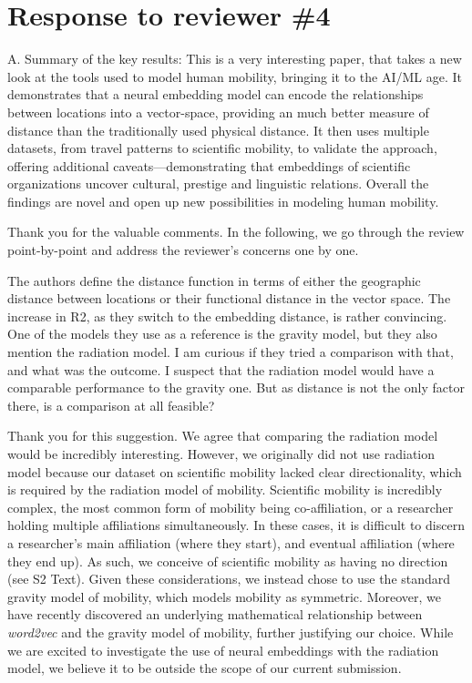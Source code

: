 \documentclass[12pt,a4paper]{article}
\newcommand{\response}[1]{{\leavevmode\noindent #1}}
\newcommand{\rcomment}[1]{%
\vspace{10pt}
\begin{tcolorbox}[colback=black!3,colframe=white!45!black]
#1
\end{tcolorbox}
}
\begin{document}
\section*{Response to reviewer \#4}

\rcomment{%
A. Summary of the key results:
This is a very interesting paper, that takes a new look at the tools used to model human mobility, bringing it to the AI/ML age. It demonstrates that a neural embedding model can encode the relationships between locations into a vector-space, providing an much better measure of distance than the traditionally used physical distance. It then uses multiple datasets, from travel patterns to scientific mobility, to validate the approach, offering additional caveats—demonstrating that embeddings of scientific organizations uncover cultural, prestige and linguistic relations. Overall the findings are novel and open up new possibilities in modeling human mobility.
}

\response{%
Thank you for the valuable comments. 
In the following, we go through the review point-by-point and address the reviewer's concerns one by one.
}

\rcomment{
The authors define the distance function in terms of either the geographic distance between locations or their functional distance in the vector space. The increase in R2, as they switch to the embedding distance, is rather convincing. One of the models they use as a reference is the gravity model, but they also mention the radiation model. I am curious if they tried a comparison with that, and what was the outcome. I suspect that the radiation model would have a comparable performance to the gravity one. But as distance is not the only factor there, is a comparison at all feasible?
}

\response{

Thank you for this suggestion. 
We agree that comparing the radiation model would be incredibly interesting.
However, we originally did not use radiation model because our dataset on scientific mobility lacked clear directionality, which is required by the radiation model of mobility. 
Scientific mobility is incredibly complex, the most common form of mobility being co-affiliation, or a researcher holding multiple affiliations simultaneously. 
In these cases, it is difficult to discern a researcher's main affiliation (where they start), and eventual affiliation (where they end up).
As such, we conceive of scientific mobility as having no direction (see S2 Text). 
Given these considerations, we instead chose to use the standard gravity model of mobility, which models mobility as symmetric.
Moreover, we have recently discovered an underlying mathematical relationship between \textit{word2vec} and the gravity model of mobility, further justifying our choice. 
While we are excited to investigate the use of neural embeddings with the radiation model, we believe it to be outside the scope of our current submission. 
}
\end{document}
